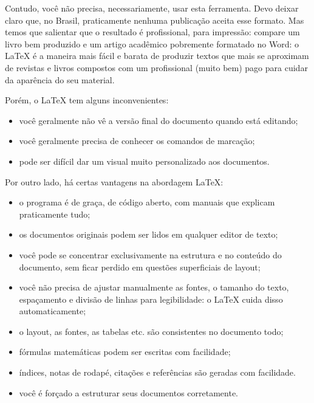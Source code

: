 \documentclass[a4paper,numbers=noenddot,abstract,DIV=calc]{scrbook} %
\begin{document}

Contudo, você não precisa, necessariamente, usar esta ferramenta. Devo deixar claro que, no Brasil, praticamente nenhuma publicação aceita esse formato. Mas temos que salientar que o resultado é profissional, para impressão: compare um livro bem produzido e um artigo acadêmico pobremente formatado no Word: o \LaTeX{} é a maneira mais fácil e barata de produzir textos que mais se aproximam de revistas e livros compostos com um profissional (muito bem) pago para cuidar da aparência do seu material. 

Porém, o \LaTeX{} tem alguns inconvenientes:
 
\begin{itemize}

\item você geralmente não vê a versão final do documento quando está editando;
\item você geralmente precisa de conhecer os comandos de marcação;
\item pode ser difícil dar um visual muito personalizado aos documentos.
\end{itemize}

Por outro lado, há certas vantagens na abordagem \LaTeX:
\begin{itemize}
\item o programa é de graça, de código aberto, com manuais que explicam praticamente tudo;
\item os documentos originais podem ser lidos em qualquer editor de texto;
\item você pode se concentrar exclusivamente na estrutura e no conteúdo do documento, sem ficar perdido em questões superficiais de layout;
\item você não precisa de ajustar manualmente as fontes, o tamanho do texto, espaçamento e divisão de linhas para legibilidade: o \LaTeX{} cuida disso automaticamente;
\item o layout, as fontes, as tabelas etc. são consistentes no documento todo;
\item fórmulas matemáticas podem ser escritas com facilidade;
\item índices, notas de rodapé, citações e referências são geradas com facilidade.
\item você é forçado a estruturar seus documentos corretamente.
\end{itemize}
\end{document}
